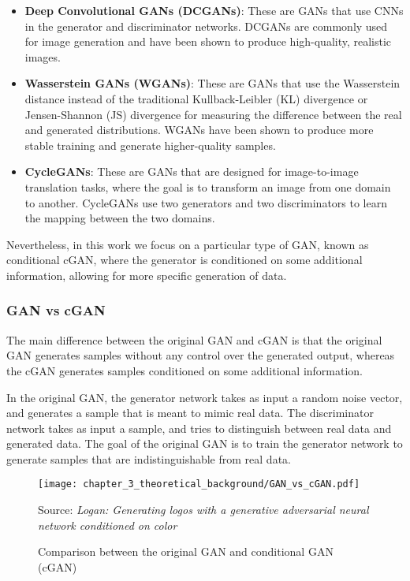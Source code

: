 \begin{itemize}
	\item \textbf{Deep Convolutional GANs (DCGANs)}: These are \acp{GAN} that use \acp{CNN} in the generator and discriminator networks. DCGANs are commonly used for image generation and have been shown to produce high-quality, realistic images.
	\item \textbf{Wasserstein GANs (WGANs)}: These are \acp{GAN} that use the Wasserstein distance instead of the traditional Kullback-Leibler (KL) divergence or Jensen-Shannon (JS) divergence for measuring the difference between the real and generated distributions. WGANs have been shown to produce more stable training and generate higher-quality samples.
	\item \textbf{CycleGANs}: These are \acp{GAN} that are designed for image-to-image translation tasks, where the goal is to transform an image from one domain to another. CycleGANs use two generators and two discriminators to learn the mapping between the two domains.
\end{itemize}

Nevertheless, in this work we focus on a particular type of \ac{GAN}, known as conditional \ac{cGAN}, where the generator is conditioned on some additional information, allowing for more specific generation of data. 

\subsubsection{GAN vs cGAN}
\label{subsubsec:3_cGAN}

The main difference between the original \ac{GAN} and \ac{cGAN} is that the original \ac{GAN} generates samples without any control over the generated output, whereas the \ac{cGAN} generates samples conditioned on some additional information.

In the original \ac{GAN}, the generator network takes as input a random noise vector, and generates a sample that is meant to mimic real data. The discriminator network takes as input a sample, and tries to distinguish between real data and generated data. The goal of the original \ac{GAN} is to train the generator network to generate samples that are indistinguishable from real data.

\begin{figure}[h]
	\centering
	\texttt{[image: chapter\_3\_theoretical\_background/GAN\_vs\_cGAN.pdf]}
	\caption{Comparison between the original GAN and conditional GAN (cGAN)}
	Source: \textit{Logan: Generating logos with a generative adversarial neural network conditioned on color} \cite{mino2018logan}
	\label{fig:chapter_3_theoretical_background/GAN_vs_cGAN}
\end{figure}

